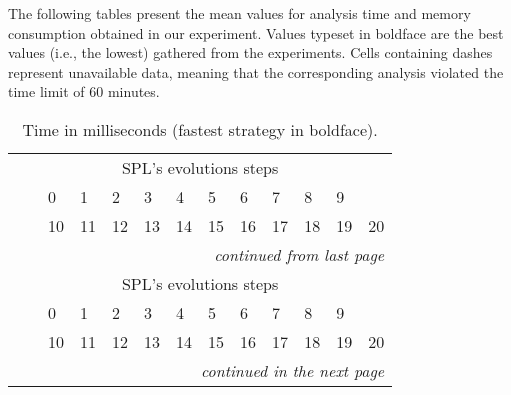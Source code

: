 The following tables present the mean values for analysis time and memory
consumption obtained in our experiment.
Values typeset in boldface are the best values (i.e., the 
lowest) gathered from the experiments.
Cells containing dashes represent unavailable data, meaning that the corresponding
analysis violated the time limit of $60$ minutes.

\begin{landscape}
\begin{tiny}
\begin{longtable}{@{}lllllllllllll@{}}
\endlastfoot
\caption{Time in milliseconds (fastest strategy in boldface).}\\
\toprule
                          &                 & \multicolumn{10}{c}{SPL's
			  evolutions steps}                \\ 
                          &                 &  0 &  1 &  2 &  3 &  4 &  5 &  6 &  7 &  8 &  9 &    \\
			  &                 & 10 & 11 & 12 & 13 & 14 & 15 & 16 & 17 & 18 & 19 & 20 \\ \midrule
\endfirsthead

			  \multicolumn{13}{r}{\textit{continued from last page}}\\
\toprule
                          &                 & \multicolumn{10}{c}{SPL's
			  evolutions steps}                \\ 
                          &                 &  0 &  1 &  2 &  3 &  4 &  5 &  6 &  7 &  8 &  9 &    \\
			  &                 & 10 & 11 & 12 & 13 & 14 & 15 & 16 & 17 & 18 & 19 & 20 \\ \midrule
\endhead

\multicolumn{13}{r}{\textit{continued in the next page}}
\endfoot


\end{longtable}
\end{tiny}
\end{landscape}
